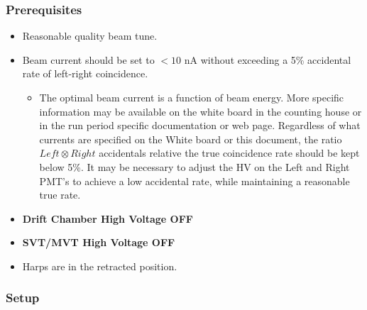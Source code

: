
\subsubsection{Prerequisites}

\begin{itemize}
\item Reasonable quality beam tune. 
\item Beam current should be set  to $<10$ nA 
without exceeding a 5\% accidental rate of left-right coincidence.

\begin{itemize}
\item The optimal beam current is a function of beam energy.
More specific information may be available on the white board in the
counting house or in the run period specific documentation or web page. Regardless
of what currents are specified on the White board or this document,
the ratio $Left\otimes Right$ accidentals relative the true coincidence
rate should be kept below 5\%. It may be necessary to adjust the
HV on the Left and Right PMT's to achieve a low accidental rate, while
maintaining a reasonable true rate.
\end{itemize}
\item \textbf{Drift Chamber High Voltage OFF}
\item \textbf{SVT/MVT High Voltage OFF}
\item Harps are in the retracted position.
\end{itemize}

\subsubsection{Setup }

